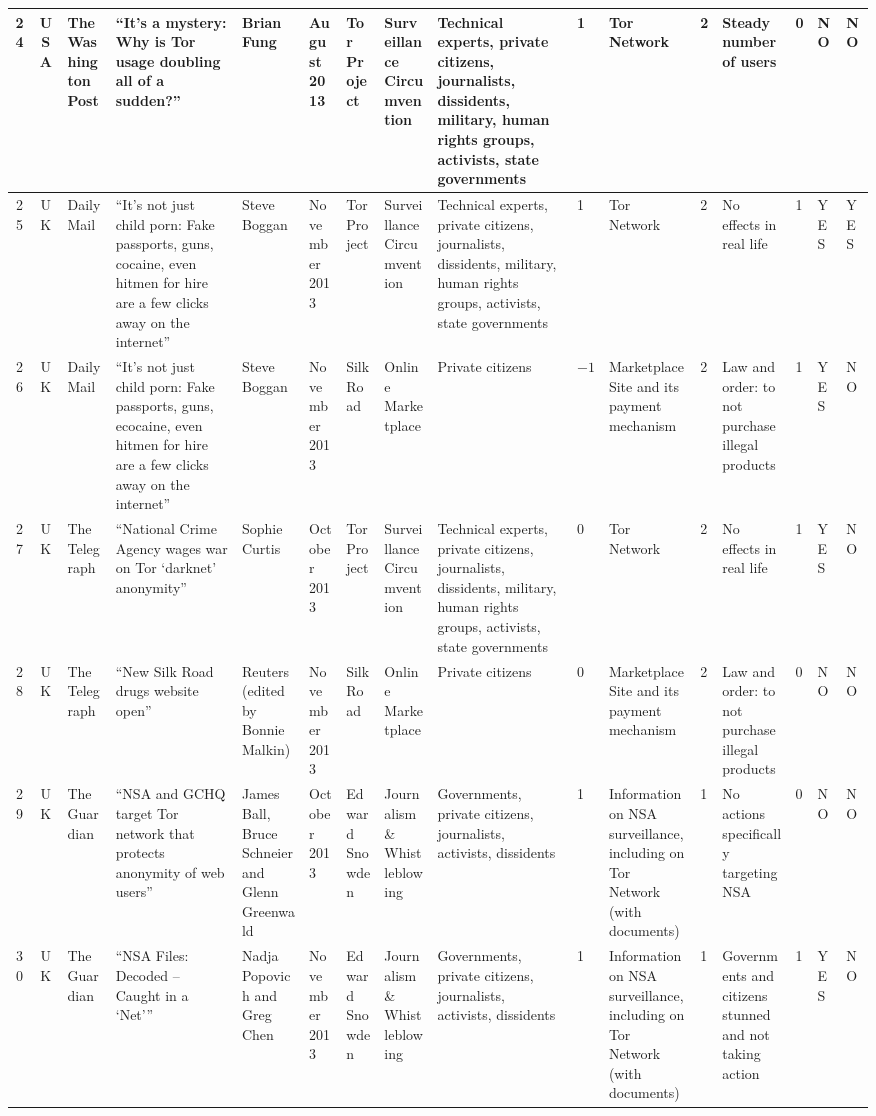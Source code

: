 \begin{landscape}
{\begin{longtable}{|c|c|p{1.2cm}|p{2.5cm}|p{1.4cm}|p{1.2cm}|p{1.4cm}|p{1.2cm}|p{1.8cm}|p{0.4cm}|p{1.8cm}|p{0.4cm}|p{1.5cm}|p{0.4cm}|p{0.6cm}|p{0.6cm}|}
\hline
24 & USA & The Washington Post & ``It's a mystery: Why is Tor usage doubling all of a sudden?'' & Brian Fung & August 2013 &Tor Project & Surveillance Circumvention & Technical experts, private citizens, journalists, dissidents, military, human rights groups, activists, state governments & 1 & Tor Network & 2 & Steady number of users & 0 & NO & NO \\
\hline
25 & UK & Daily Mail & ``It's not just child porn: Fake passports, guns, cocaine, even hitmen for hire are a few clicks away on the internet'' & Steve Boggan & November 2013 &Tor Project & Surveillance Circumvention & Technical experts, private citizens, journalists, dissidents, military, human rights groups, activists, state governments & 1 & Tor Network & 2 & No effects in real life & 1 & YES & YES \\
\hline
26 & UK & Daily Mail & ``It's not just child porn: Fake passports, guns, ecocaine, even hitmen for hire are a few clicks away on the internet'' & Steve Boggan & November 2013 &Silk Road & Online Marketplace & Private citizens & $-1$ & Marketplace Site and its payment mechanism & 2 & Law and order: to not purchase illegal products & 1 & YES & NO \\
\hline
27 & UK & The Telegraph & ``National Crime Agency wages war on Tor `darknet' anonymity'' & Sophie Curtis & October 2013 &Tor Project & Surveillance Circumvention & Technical experts, private citizens, journalists, dissidents, military, human rights groups, activists, state governments & 0 & Tor Network & 2 & No effects in real life & 1 & YES & NO \\
\hline
28 & UK & The Telegraph & ``New Silk Road drugs website open'' & Reuters (edited by Bonnie Malkin) & November 2013 &Silk Road & Online Marketplace & Private citizens & 0 & Marketplace Site and its payment mechanism & 2 & Law and order: to not purchase illegal products & 0 & NO & NO \\
\hline
29 & UK & The Guardian & ``NSA and GCHQ target Tor network that protects anonymity of web users'' & James Ball, Bruce Schneier and Glenn Greenwald & October 2013 &Edward Snowden & Journalism \& Whistleblowing & Governments, private citizens, journalists, activists, dissidents & 1 & Information on NSA surveillance, including on Tor Network (with documents) & 1 & No actions specifically targeting NSA & 0 & NO & NO \\
\hline
30 & UK & The Guardian & ``NSA Files: Decoded -- Caught in a `Net''' & Nadja Popovich and Greg Chen & November 2013 &Edward Snowden & Journalism \& Whistleblowing & Governments, private citizens, journalists, activists, dissidents & 1 & Information on NSA surveillance, including on Tor Network (with documents) & 1 & Governments and citizens stunned and not taking action & 1 & YES & NO \\

\end{longtable}}
\end{landscape}
